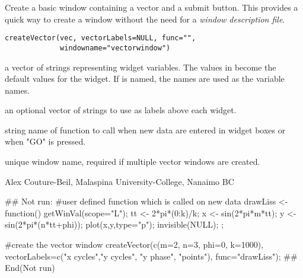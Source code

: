 \documentclass[letterpaper]{book}
\begin{document}
\begin{Description}\relax
Create a basic window containing a vector and a submit button. 
This provides a quick way to create a window without the need 
for a \emph{window description file}.
\end{Description}
\begin{Usage}
\begin{verbatim}
createVector(vec, vectorLabels=NULL, func="", 
             windowname="vectorwindow")\end{verbatim}
\end{Usage}
\begin{Arguments}
\begin{ldescription}
\item[\code{vec}] a vector of strings representing widget variables. 
The values in  become the default values for the widget.
If  is named, the names are used as the variable names. 
\item[\code{vectorLabels}] an optional vector of strings to use as labels above each widget.
\item[\code{func}] string name of function to call when new data are entered 
in widget boxes or when "GO" is pressed.
\item[\code{windowname}] unique window name, required if multiple vector windows are created.
\end{ldescription}
\end{Arguments}
\begin{Author}\relax
Alex Couture-Beil, Malaspina University-College, Nanaimo BC
\end{Author}
\begin{SeeAlso}\relax
{}
\end{SeeAlso}
\begin{Examples}
\begin{ExampleCode}
## Not run: 
#user defined function which is called on new data      
drawLiss <- function() {
  getWinVal(scope="L");
  tt <- 2*pi*(0:k)/k; x <- sin(2*pi*m*tt); y <- sin(2*pi*(n*tt+phi));
  plot(x,y,type="p"); invisible(NULL); };

#create the vector window
createVector(c(m=2, n=3, phi=0, k=1000), 
  vectorLabels=c("x cycles","y cycles", "y phase", "points"), 
  func="drawLiss");
## End(Not run)
\end{ExampleCode}
\end{Examples}
\end{document}
